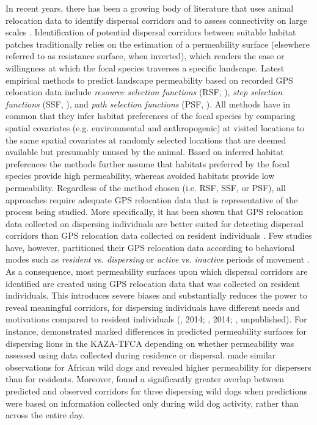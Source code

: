 \documentclass[abstract=on,10pt,a4paper,bibliography=totocnumbered]{scrartcl}
\begin{document}
In recent years, there has been a growing body of literature that uses animal
relocation data to identify dispersal corridors and to assess connectivity on
large scales \citep{Chetkiewicz.2006}. Identification of potential dispersal
corridors between suitable habitat patches traditionally relies on the
estimation of a permeability surface (elsewhere referred to as resistance
surface, when inverted), which renders the ease or willingness at which the
focal species traverses a specific landscape. Latest empirical methods to
predict landscape permeability based on recorded GPS relocation data include
\textit{resource selection functions} (RSF, \cite{Boyce.2002}), \textit{step
selection functions} (SSF, \cite{Fortin.2005}), and \textit{path selection
functions} (PSF, \cite{Cushman.2010}). All methods have in common that they
infer habitat preferences of the focal species by comparing spatial covariates
(e.g. environmental and anthropogenic) at visited locations to the same spatial
covariates at randomly selected locations that are deemed available but
presumably unused by the animal. Based on inferred habitat preferences the
methods further assume that habitats preferred by the focal species provide high
permeability, whereas avoided habitats provide low permeability. Regardless of
the method chosen (i.e. RSF, SSF, or PSF), all approaches require adequate GPS
relocation data that is representative of the process being studied. More
specifically, it has been shown that GPS relocation data collected on dispersing
individuals are better suited for detecting dispersal corridors than GPS
relocation data collected on resident individuals \citep{Elliot.2014}. Few
studies have, however, partitioned their GPS relocation data according to
behavioral modes such as \textit{resident} vs. \textit{dispersing} or
\textit{active} vs. \textit{inactive} periods of movement \citep{Wilson.2012,
Vasudev.2015}. As a consequence, most permeability surfaces upon which dispersal
corridors are identified are created using GPS relocation data that was
collected on resident individuals. This introduces severe biases and
substantially reduces the power to reveal meaningful corridors, for dispersing
individuals have different needs and motivations compared to resident
individuals (\citeauthor{Killeen.2014}, 2014; \citeauthor{Elliot.2014}, 2014;
\citeauthor{Cozzi.2020}, unpublished). For instance, \cite{Elliot.2014}
demonstrated marked differences in predicted permeability surfaces for
dispersing lions in the KAZA-TFCA depending on whether permeability was assessed
using data collected during residence or dispersal. \cite{Jackson.2016} made
similar observations for African wild dogs and revealed higher permeability for
dispersers than for residents. Moreover, \cite{Abrahms.2017} found a
significantly greater overlap between predicted and observed corridors for three
dispersing wild dogs when predictions were based on information collected only
during wild dog activity, rather than across the entire day.
\end{document}
